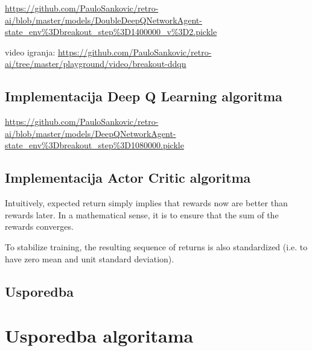 \url{https://github.com/PauloSankovic/retro-ai/blob/master/models/DoubleDeepQNetworkAgent-state_env\%3Dbreakout_step\%3D1400000_v\%3D2.pickle}

video igranja:
\url{https://github.com/PauloSankovic/retro-ai/tree/master/playground/video/breakout-ddqn}

\subsection{Implementacija Deep Q Learning algoritma}

\url{https://github.com/PauloSankovic/retro-ai/blob/master/models/DeepQNetworkAgent-state_env\%3Dbreakout_step\%3D1080000.pickle}

\subsection{Implementacija Actor Critic algoritma}

Intuitively, expected return simply implies that rewards now are better than rewards later. In a mathematical sense, it is to ensure that the sum of the rewards converges.

To stabilize training, the resulting sequence of returns is also standardized (i.e. to have zero mean and unit standard deviation).

\subsection{Usporedba}

\section{Usporedba algoritama}

